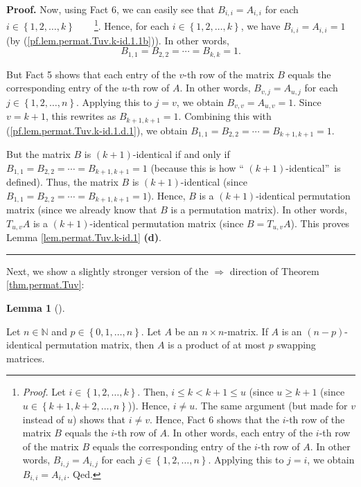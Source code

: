 \documentclass[numbers=enddot,12pt,final,onecolumn,notitlepage]{scrartcl}%
\theoremstyle{definition}
\newtheorem{lem}[theo]{Lemma}
\newenvironment{lemma}[1][]
{\begin{lem}[#1]\begin{leftbar}}
{\end{leftbar}\end{lem}}
\newenvironment{proof}[1][Proof]{\noindent\textbf{#1.} }{\ \rule{0.5em}{0.5em}}
\begin{document}
\begin{proof}
Now, using Fact 6, we can easily see that $B_{i,i}=A_{i,i}$ for each
$i\in\left\{  1,2,\ldots,k\right\}  $\ \ \ \ \footnote{\textit{Proof.} Let
$i\in\left\{  1,2,\ldots,k\right\}  $. Then, $i\leq k<k+1\leq u$ (since $u\geq
k+1$ (since $u\in\left\{  k+1,k+2,\ldots,n\right\}  $)). Hence, $i\neq u$. The
same argument (but made for $v$ instead of $u$) shows that $i\neq v$. Hence,
Fact 6 shows that the $i$-th row of the matrix $B$ equals the $i$-th row of
$A$. In other words, each entry of the $i$-th row of the matrix $B$ equals the
corresponding entry of the $i$-th row of $A$. In other words, $B_{i,j}%
=A_{i,j}$ for each $j\in\left\{  1,2,\ldots,n\right\}  $. Applying this to
$j=i$, we obtain $B_{i,i}=A_{i,i}$. Qed.}. Hence, for each $i\in\left\{
1,2,\ldots,k\right\}  $, we have $B_{i,i}=A_{i,i}=1$ (by
(\ref{pf.lem.permat.Tuv.k-id.1.1b})). In other words,%
\begin{equation}
B_{1,1}=B_{2,2}=\cdots=B_{k,k}=1. \label{pf.lem.permat.Tuv.k-id.1.d.1}%
\end{equation}


But Fact 5 shows that each entry of the $v$-th row of the matrix $B$ equals
the corresponding entry of the $u$-th row of $A$. In other words,
$B_{v,j}=A_{u,j}$ for each $j\in\left\{  1,2,\ldots,n\right\}  $. Applying
this to $j=v$, we obtain $B_{v,v}=A_{u,v}=1$. Since $v=k+1$, this rewrites as
$B_{k+1,k+1}=1$. Combining this with (\ref{pf.lem.permat.Tuv.k-id.1.d.1}), we
obtain $B_{1,1}=B_{2,2}=\cdots=B_{k+1,k+1}=1$.

But the matrix $B$ is $\left(  k+1\right)  $-identical if and only if
$B_{1,1}=B_{2,2}=\cdots=B_{k+1,k+1}=1$ (because this is how \textquotedblleft%
$\left(  k+1\right)  $-identical\textquotedblright\ is defined). Thus, the
matrix $B$ is $\left(  k+1\right)  $-identical (since $B_{1,1}=B_{2,2}%
=\cdots=B_{k+1,k+1}=1$). Hence, $B$ is a $\left(  k+1\right)  $-identical
permutation matrix (since we already know that $B$ is a permutation matrix).
In other words, $T_{u,v}A$ is a $\left(  k+1\right)  $-identical permutation
matrix (since $B=T_{u,v}A$). This proves Lemma \ref{lem.permat.Tuv.k-id.1}
\textbf{(d)}.
\end{proof}

Next, we show a slightly stronger version of the $\Longrightarrow$ direction
of Theorem \ref{thm.permat.Tuv}:

\begin{lemma}
\label{lem.permat.Tuv.k-id.2}Let $n\in\mathbb{N}$ and $p\in\left\{
0,1,\ldots,n\right\}  $. Let $A$ be an $n\times n$-matrix. If $A$ is an
$\left(  n-p\right)  $-identical permutation matrix, then $A$ is a product of
at most $p$ swapping matrices.
\end{lemma}
\end{document}
